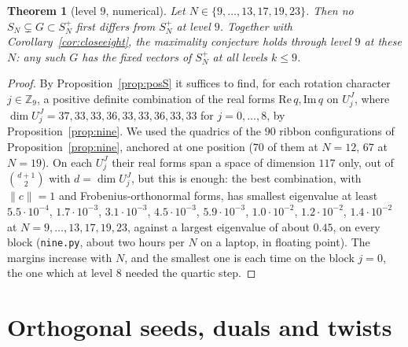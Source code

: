 \documentclass[11pt]{amsart}
\newtheorem{theorem}{Theorem}[section]
\theoremstyle{definition}
\theoremstyle{remark}
\theoremstyle{plain}
\numberwithin{equation}{section}
\numberwithin{table}{section}
\newcommand{\Z}{\mathbb Z}
\begin{document}
\begin{theorem}[level $9$, numerical]\label{thm:nine}
Let $N\in\{9,\dots,13,17,19,23\}$. Then no $S_N\subsetneq G\subset S_N^+$ first differs from $S_N^+$ at level $9$. Together with Corollary~\ref{cor:closeeight}, the maximality conjecture holds through level $9$ at these $N$: any such $G$ has the fixed vectors of $S_N^+$ at all levels $k\le9$.
\end{theorem}

\begin{proof}
By Proposition~\ref{prop:posS} it suffices to find, for each rotation character $j\in\Z_9$, a positive definite combination of the real forms $\mathrm{Re}\,q,\mathrm{Im}\,q$ on $U_j^J$, where $\dim U_j^J=37,33,33,36,33,33,36,33,33$ for $j=0,\dots,8$, by Proposition~\ref{prop:nine}. We used the quadrics of the $90$ ribbon configurations of Proposition~\ref{prop:nine}, anchored at one position ($70$ of them at $N=12$, $67$ at $N=19$). On each $U_j^J$ their real forms span a space of dimension $117$ only, out of $\binom{d+1}{2}$ with $d=\dim U_j^J$, but this is enough: the best combination, with $\|c\|=1$ and Frobenius-orthonormal forms, has smallest eigenvalue at least $5.5\cdot10^{-4}$, $1.7\cdot10^{-3}$, $3.1\cdot10^{-3}$, $4.5\cdot10^{-3}$, $5.9\cdot10^{-3}$, $1.0\cdot10^{-2}$, $1.2\cdot10^{-2}$, $1.4\cdot10^{-2}$ at $N=9,\dots,13,17,19,23$, against a largest eigenvalue of about $0.45$, on every block (\texttt{nine.py}, about two hours per $N$ on a laptop, in floating point). The margins increase with $N$, and the smallest one is each time on the block $j=0$, the one which at level $8$ needed the quartic step.
\end{proof}



\section{Orthogonal seeds, duals and twists}\label{sec:orthproblem}
\end{document}
